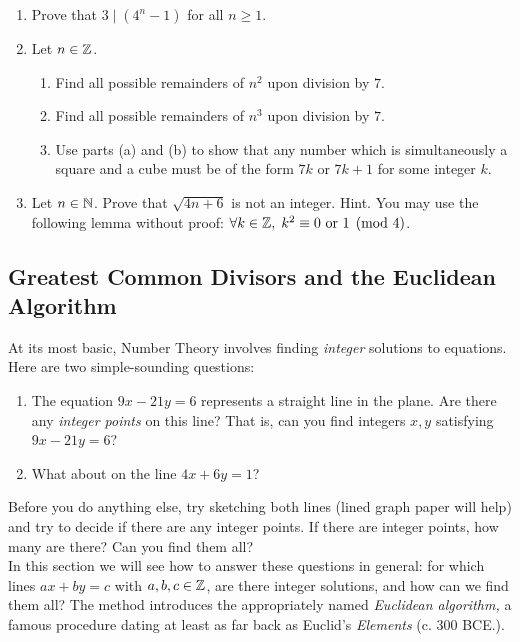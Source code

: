 \begin{exercises}{}{}
\begin{enumerate}
    \item Prove that $3 \mid (4^n - 1)$ for all $n \geq 1$.
    
    
    \item Let $n \in \mathbb{Z}$.
    \begin{enumerate}
        \item Find all possible remainders of $n^2$ upon division by $7$.
        \item Find all possible remainders of $n^3$ upon division by $7$.
        \item Use parts (a) and (b) to show that any number which is simultaneously a square and a cube must be of the form $7k$ or $7k + 1$ for some integer $k$.
    \end{enumerate}
    
\item Let $n \in \mathbb{N}$.  Prove that $\sqrt{4n+6}$ is not an integer.  Hint.  You may use the following lemma without proof: $\forall k \in \mathbb{Z},\; k^2 \equiv 0 \text{ or } 1 \pmod 4$.
\end{enumerate}

\end{exercises}

\clearpage


\subsection{Greatest Common Divisors and the Euclidean Algorithm}\label{sec:gcd}

At its most basic, Number Theory involves finding \emph{integer} solutions to equations. Here are two simple-sounding questions:
\begin{enumerate}
  \item The equation $9x-21y=6$ represents a straight line in the plane. Are there any \emph{integer points} on this line? That is, can you find integers $x,y$ satisfying $9x-21y=6$?
  \item What about on the line $4x+6y=1$?
\end{enumerate}
Before you do anything else, try sketching both lines (lined graph paper will help) and try to decide if there are any integer points. If there are integer points, how many are there? Can you find them all?\\

In this section we will see how to answer these questions in general: for which lines $ax+by=c$ with $a,b,c\in\mathbb{Z}$, are there integer solutions, and how can we find them all? The method introduces the appropriately named \emph{Euclidean algorithm,} a famous procedure dating at least as far back as Euclid's \emph{Elements} (c. 300 BCE.).

